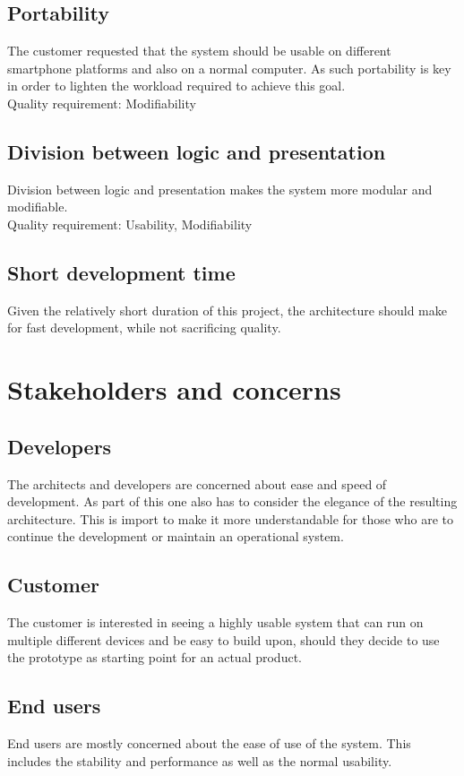 \documentclass[11pt]{book}
\begin{document}
\subsection{Portability}
The customer requested that the system should be usable on different smartphone platforms and also on a normal computer. As such portability is key in order to lighten the workload required to achieve this goal.\\
Quality requirement: Modifiability

\subsection{Division between logic and presentation}
Division between logic and presentation makes the system more modular and modifiable.\\
Quality requirement: Usability, Modifiability

\subsection{Short development time}
Given the relatively short duration of this project, the architecture should make for fast development, while not sacrificing quality.

\section{Stakeholders and concerns}

\subsection{Developers}
The architects and developers are concerned about ease and speed of development. As part of this one also has to consider the elegance of the resulting architecture. This is import to make it more understandable for those who are to continue the development or maintain an operational system.

\subsection{Customer}
The customer is interested in seeing a highly usable system that can run on multiple different devices and be easy to build upon, should they decide to use the prototype as starting point for an actual product.

\subsection{End users}
End users are mostly concerned about the ease of use of the system. This includes the stability and performance as well as the normal usability.
\end{document}
